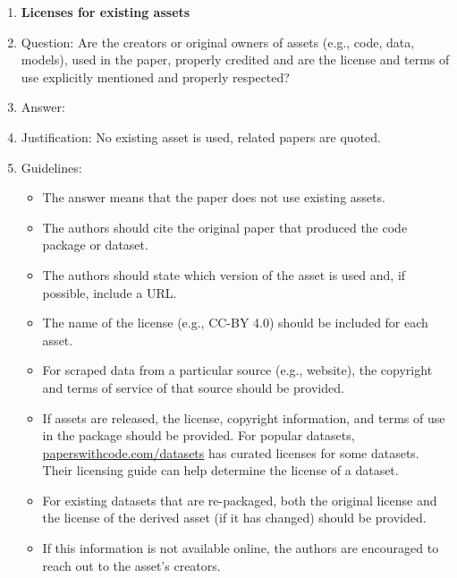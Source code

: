 \documentclass{article}
\numberwithin{theorem}{section}
\theoremstyle{definition}
\begin{document}
\begin{enumerate}
\item {\bf Licenses for existing assets}
    \item[] Question: Are the creators or original owners of assets (e.g., code, data, models), used in the paper, properly credited and are the license and terms of use explicitly mentioned and properly respected?
    \item[] Answer: \answerNA{} %
    \item[] Justification: No existing asset is used, related papers are quoted.
    \item[] Guidelines:
    \begin{itemize}
        \item The answer \answerNA{} means that the paper does not use existing assets.
        \item The authors should cite the original paper that produced the code package or dataset.
        \item The authors should state which version of the asset is used and, if possible, include a URL.
        \item The name of the license (e.g., CC-BY 4.0) should be included for each asset.
        \item For scraped data from a particular source (e.g., website), the copyright and terms of service of that source should be provided.
        \item If assets are released, the license, copyright information, and terms of use in the package should be provided. For popular datasets, \url{paperswithcode.com/datasets} has curated licenses for some datasets. Their licensing guide can help determine the license of a dataset.
        \item For existing datasets that are re-packaged, both the original license and the license of the derived asset (if it has changed) should be provided.
        \item If this information is not available online, the authors are encouraged to reach out to the asset's creators.
    \end{itemize}


\end{enumerate}
\end{document}
